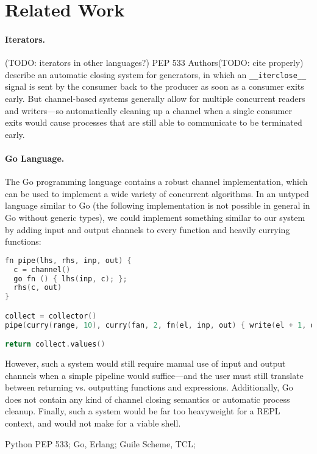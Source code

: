 \documentclass[english,preprint,JIP]{ipsj}
\begin{document}
\section{Related Work}

\paragraph{Iterators.}
(TODO: iterators in other languages?)
PEP 533 Authors(TODO: cite properly) describe an automatic closing system for generators, in which an \verb/__iterclose__/ signal is sent by the consumer back to the producer as soon as a consumer exits early.
But channel-based systems generally allow for multiple concurrent readers and writers---so automatically cleaning up a channel when a single consumer exits would cause processes that are still able to communicate to be terminated early.

\paragraph{Go Language.}

The Go programming language contains a robust channel implementation, which can be used to implement a wide variety of concurrent algorithms. In an untyped language similar to Go (the following implementation is not possible in general in Go without generic types), we could implement something similar to our system by adding input and output channels to every function and heavily currying functions:
\begin{lstlisting}[language=C, morekeywords={fn,channel,nil,go}]
fn pipe(lhs, rhs, inp, out) {
  c = channel()
  go fn () { lhs(inp, c); };
  rhs(c, out)
}

collect = collector()
pipe(curry(range, 10), curry(fan, 2, fn(el, inp, out) { write(el + 1, out); }), nil, collect);

return collect.values()
\end{lstlisting}

However, such a system would still require manual use of input and output channels when a simple pipeline would suffice---and the user must still translate between returning vs. outputting functions and expressions. Additionally, Go does not contain any kind of channel closing semantics or automatic process cleanup. Finally, such a system would be far too heavyweight for a REPL context, and would not make for a viable shell.

Python PEP 533; Go, Erlang; Guile Scheme, TCL;
\end{document}
